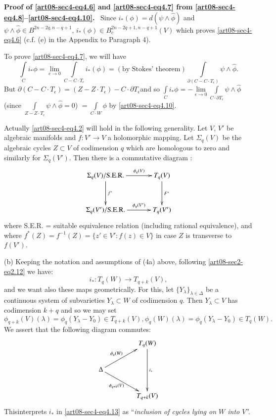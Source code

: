 \medskip
\noindent
{\bf Proof of \eqref{art08-sec4-eq4.6} and \eqref{art08-sec4-eq4.7} from \eqref{art08-sec4-eq4.8}--\eqref{art08-sec4-eq4.10}.}~ Since $i_{*}(\phi)=d(\psi\wedge \widehat{\phi})$ and $\psi\wedge\widehat{\phi}\in B^{2n-2q,n-q+1}$, $i_{*}(\phi)\in B^{2n-2q+1,n-q+1}_{c}(V)$ which proves \eqref{art08-sec4-eq4.6} (c.f. (e) in the Appendix to Paragraph 4).

To prove \eqref{art08-sec4-eq4.7}, we will have
$$
\int\limits_{C}i_{*}\phi=\lim\limits_{e\to 0}\int\limits_{C-C\cdot T_{\epsilon}}i_{*}(\phi)=(\text{by Stokes' theorem})\int\limits_{\partial(C-C\cdot T_{\epsilon})}\psi\wedge \widehat{\phi}.
$$
But $\partial(C-C\cdot T_{\epsilon})=(Z-Z\cdot T_{\epsilon})-C\cdot \partial T_{\epsilon}$\pageoriginale and so $\int\limits_{C}i_{*}\phi=-\lim\limits_{\epsilon\to 0}\int\limits_{C\cdot \partial T_{\epsilon}}\psi \wedge \widehat{\phi}$ (since $\int\limits_{Z-Z\cdot T_{\epsilon}}\psi \wedge \widehat{\phi}=0$) $=\int\limits_{C\cdot W}\phi$ by \eqref{art08-sec4-eq4.10}.

\setcounter{theorem}{11}
\begin{remark}\label{art08-sec4-rem4.12}
Actually \eqref{art08-sec4-eq4.2} will hold in the following generality. Let $V$, $V'$ be algebraic manifolds and $f:V'\to V$ a holomorphic mapping. Let $\Sigma_{q}(V)$ be the algebraic cycles $Z\subset V$ of codimension $q$ which are homologous to zero and similarly for $\Sigma_{q}(V')$. Then there is a commutative diagram :
\[
\xymatrix@=1.2cm{
\Sigma_{q}(V)/\text{S.E.R.}\ar[d]^-{f^{*}}\ar[r]^-{\phi_{q}(V)} & T_{q}(V)\ar[d]^-{F^{*}}\\
\Sigma_{q}(V')/\text{S.E.R.}\ar[r]^-{\phi_{q}(V')} & T_{q}(V')
}
\]
where S.E.R. = suitable equivalence relation (including rational equivalence), and where $f^{*}(Z)=f^{-1}(Z)=\{z'\in V':f(z)\in V\}$ in case $Z$ is transverse to $f(V')$.

(b) Keeping the notation and assumptions of (4a) above, following \eqref{art08-sec2-eq2.12} we have:
\setcounter{equation}{12}
\begin{equation}
i_{*}:T_{q}(W)\to T_{q+k}(V),\label{art08-sec4-eq4.13}
\end{equation}
and we want also these maps geometrically. For this, let $\{Y_{\lambda}\}_{\lambda\in \Delta}$ be a continuous system of subvarieties $Y_{\lambda}\subset W$ of codimension $q$. Then $Y_{\lambda}\subset V$ has codimension $k+q$ and so we may set
$$
\phi_{q+k}(V)(\lambda)=\phi_{q}(Y_{\lambda}-Y_{0})\in T_{q+k}(V),\phi_{q}(W)(\lambda)=\phi_{q}(Y_{\lambda}-Y_{0})\in T_{q}(W).
$$
We assert that the following diagram commutes:
\setcounter{equation}{13}
\begin{equation}
\vcenter{\xymatrix@C=1.5cm{
 & T_{q}(W)\ar[dd]^-{i_{*}}\\
\Delta\ar[ur]^-{\phi_{q}(W)}\ar[dr]_-{\phi_{q+k}(V)} &\\
 & T_{q+k}(V)
}}\label{art08-sec4-eq4.14}
\end{equation}
This\pageoriginale interprets $i_{*}$ in \eqref{art08-sec4-eq4.13} as ``{\em inclusion of cycles lying on $W$ into $V$}''.
\end{remark}

